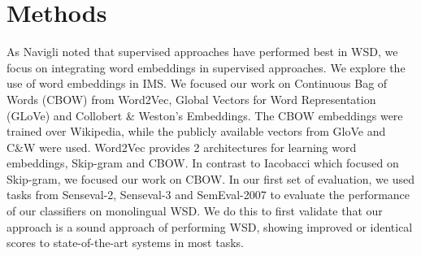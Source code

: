	\section{Methods}
\label{section:methods}

As Navigli  noted that supervised approaches have performed best in WSD, we focus on integrating word embeddings in supervised approaches.
We explore the use of word embeddings in IMS. We focused our work on Continuous Bag of Words (CBOW) from Word2Vec,  Global Vectors for Word Representation (GLoVe) and Collobert \& Weston's Embeddings. The CBOW embeddings were trained over Wikipedia, while the publicly available vectors from GloVe and C\&W were used. Word2Vec provides 2 architectures for learning word embeddings, Skip-gram and CBOW. In contrast to Iacobacci  which focused on Skip-gram, we focused our work on CBOW.
In our first set of evaluation, we used tasks from Senseval-2, Senseval-3 and SemEval-2007 to evaluate the performance of our classifiers on monolingual WSD. We do this to first validate that our approach is a sound approach of performing WSD, showing improved or identical scores to state-of-the-art systems in most tasks. 

